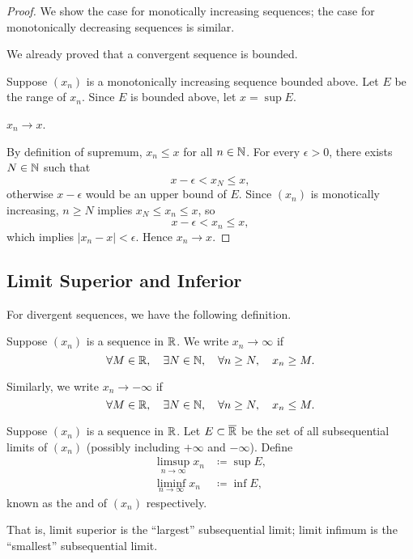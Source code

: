 \begin{proof}
We show the case for monotically increasing sequences; the case for monotonically decreasing sequences is similar.

\fbox{$\implies$} We already proved that a convergent sequence is bounded.

\fbox{$\impliedby$} Suppose $(x_n)$ is a monotonically increasing sequence bounded above. Let $E$ be the range of $x_n$. Since $E$ is bounded above, let $x=\sup E$.
\begin{claim}
$x_n\to x$.
\end{claim}
By definition of supremum, $x_n\le x$ for all $n\in\mathbb N$. For every $\epsilon>0$, there exists $N\in\mathbb N$ such that
\[x-\epsilon<x_N\le x,\]
otherwise $x-\epsilon$ would be an upper bound of $E$. Since $(x_n)$ is monotically increasing, $n\ge N$ implies $x_N\le x_n\le x$, so 
\[x-\epsilon<x_n\le x,\]
which implies $|x_n-x|<\epsilon$. Hence $x_n\to x$.
\end{proof}
\pagebreak

\subsection{Limit Superior and Inferior}
For divergent sequences, we have the following definition.
\begin{definition}
Suppose $(x_n)$ is a sequence in $\mathbb R$. We write $x_n\to\infty$ if
\[\forall M\in\mathbb R,\quad\exists N\in\mathbb N,\quad\forall n\ge N,\quad x_n\ge M.\]

Similarly, we write $x_n\to-\infty$ if 
\[\forall M\in\mathbb R,\quad\exists N\in\mathbb N,\quad\forall n\ge N,\quad x_n\le M.\]
\end{definition}

\begin{definition}
Suppose $(x_n)$ is a sequence in $\mathbb R$. Let $E\subset\overline{\mathbb R}$ be the set of all subsequential limits of $(x_n)$ (possibly including $+\infty$ and $-\infty$). Define 
\begin{align*}
\limsup_{n\to\infty}x_n&\coloneqq\sup E,\\
\liminf_{n\to\infty}x_n&\coloneqq\inf E,
\end{align*}
known as the  and  of $(x_n)$ respectively.
\end{definition}

\begin{remark}
That is, limit superior is the ``largest'' subsequential limit; limit infimum is the ``smallest'' subsequential limit. 
\end{remark}

